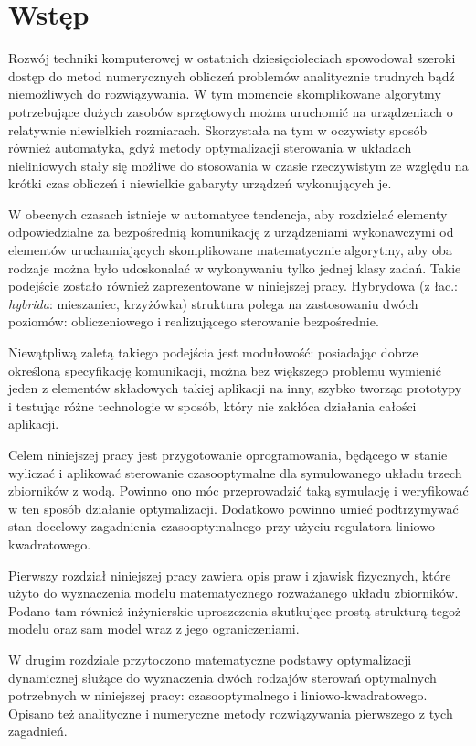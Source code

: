 \chapter*{Wstęp}

Rozwój techniki komputerowej w ostatnich dziesięcioleciach spowodował szeroki dostęp do metod numerycznych obliczeń problemów analitycznie trudnych bądź niemożliwych do rozwiązywania. W tym momencie skomplikowane algorytmy potrzebujące dużych zasobów sprzętowych można uruchomić na urządzeniach o relatywnie niewielkich rozmiarach.
Skorzystała na tym w oczywisty sposób również automatyka, gdyż metody optymalizacji sterowania w układach nieliniowych stały się możliwe do stosowania w czasie rzeczywistym ze względu na krótki czas obliczeń i niewielkie gabaryty urządzeń wykonujących je.

W obecnych czasach istnieje w automatyce tendencja, aby rozdzielać elementy odpowiedzialne za bezpośrednią komunikację z urządzeniami wykonawczymi od elementów uruchamiających skomplikowane matematycznie algorytmy, aby oba rodzaje można było udoskonalać w wykonywaniu tylko jednej klasy zadań.
Takie podejście zostało również zaprezentowane w niniejszej pracy. Hybrydowa (z łac.: \emph{hybrida}: mieszaniec, krzyżówka) struktura polega na zastosowaniu dwóch poziomów: obliczeniowego i realizującego sterowanie bezpośrednie. 

Niewątpliwą zaletą takiego podejścia jest modułowość: posiadając dobrze określoną specyfikację komunikacji, można bez większego problemu wymienić jeden z elementów składowych takiej aplikacji na inny, szybko tworząc prototypy i testując różne technologie w sposób, który nie zakłóca działania całości aplikacji.

Celem niniejszej pracy jest przygotowanie oprogramowania, będącego w stanie wyliczać i aplikować sterowanie czasooptymalne dla symulowanego układu trzech zbiorników z wodą. Powinno ono móc przeprowadzić taką symulację i weryfikować w ten sposób działanie optymalizacji. Dodatkowo powinno umieć podtrzymywać stan docelowy zagadnienia czasooptymalnego przy użyciu regulatora liniowo-kwadratowego.

Pierwszy rozdział niniejszej pracy zawiera opis praw i zjawisk fizycznych, które użyto do wyznaczenia modelu matematycznego rozważanego układu zbiorników. Podano tam również inżynierskie uproszczenia skutkujące prostą strukturą tegoż modelu oraz sam model wraz z jego ograniczeniami.

W drugim rozdziale przytoczono matematyczne podstawy optymalizacji dynamicznej służące do wyznaczenia dwóch rodzajów sterowań optymalnych potrzebnych w niniejszej pracy: czasooptymalnego i liniowo-kwadratowego. Opisano też analityczne i numeryczne metody rozwiązywania pierwszego z tych zagadnień.

